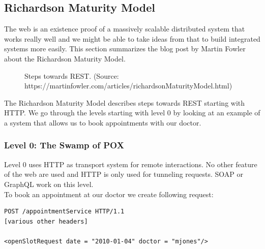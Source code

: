 \subsection{Richardson Maturity Model}\label{richardsonmaturitymodel}
The web is an existence proof of a massively scalable distributed system that works really well and we might be able to take ideas from that to build integrated systems more easily. \citep{richardsonmaturitymodel} This section summarizes the blog post by Martin Fowler about the Richardson Maturity Model.

\begin{figure}[!htb]
  \caption{Steps towards REST. (Source: https://martinfowler.com/articles/richardsonMaturityModel.html)}
\end{figure}

The Richardson Maturity Model describes steps towards REST starting with HTTP. We go through the levels starting with level 0 by looking at an example of a system that allows us to book appointments with our doctor.

\subsubsection{Level 0: The Swamp of POX}
Level 0 uses HTTP as transport system for remote interactions. No other feature of the web are used and HTTP is only used for tunneling requests. SOAP or GraphQL work on this level. \\
To book an appointment at our doctor we create following request:

\lstset{language=XML}
\begin{lstlisting}[caption=Level 0: Remote procedure call on HTTP]
POST /appointmentService HTTP/1.1
[various other headers]

<openSlotRequest date = "2010-01-04" doctor = "mjones"/>
\end{lstlisting}

